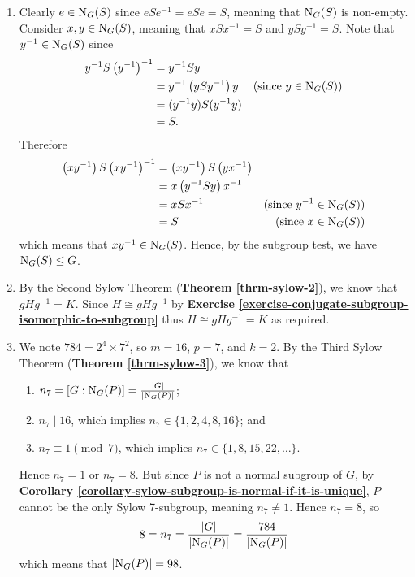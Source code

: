 \begin{enumerate}
    \item Clearly $e \in \mathrm{N}_{G}(S)$ since $eSe^{-1} = eSe = S$, meaning that $\mathrm{N}_{G}(S)$ is non-empty. Consider $x, y \in \mathrm{N}_{G}(S)$, meaning that $xSx^{-1} = S$ and $ySy^{-1} = S$. Note that $y^{-1} \in \mathrm{N}_{G}(S)$ since
    \begin{align*}
        y^{-1}S\left(y^{-1}\right)^{-1} &= y^{-1}Sy\\
        &= y^{-1}\left(ySy^{-1}\right)y & (\text{since } y \in \mathrm{N}_{G}(S))\\
        &= (y^{-1}y)S(y^{-1}y)\\
        &= S.
    \end{align*}
    Therefore
    \begin{align*}
        \left(xy^{-1}\right)S\left(xy^{-1}\right)^{-1} &= \left(xy^{-1}\right)S\left(yx^{-1}\right)\\
        &= x\left(y^{-1}Sy\right)x^{-1}\\
        &= xSx^{-1} & (\text{since } y^{-1} \in \mathrm{N}_{G}(S))\\
        &= S & (\text{since } x \in \mathrm{N}_{G}(S))
    \end{align*}
    which means that $xy^{-1} \in \mathrm{N}_{G}(S)$. Hence, by the subgroup test, we have $\mathrm{N}_{G}(S) \leq G$.

    \item By the Second Sylow Theorem (\textbf{Theorem \ref{thrm-sylow-2}}), we know that $gHg^{-1} = K$. Since $H \cong gHg^{-1}$ by \textbf{Exercise \ref{exercise-conjugate-subgroup-isomorphic-to-subgroup}} thus $H \cong gHg^{-1} = K$ as required.

    \item We note $784 = 2^4 \times 7^2$, so $m = 16$, $p = 7$, and $k = 2$. By the Third Sylow Theorem (\textbf{Theorem \ref{thrm-sylow-3}}), we know that
    \begin{enumerate}
        \item $n_7 = [G : \mathrm{N}_{G}(P)] = \frac{|G|}{|\mathrm{N}_{G}(P)|}$;
        \item $n_7 \mid 16$, which implies $n_7 \in \{1, 2, 4, 8, 16\}$; and
        \item $n_7 \equiv 1 \pmod 7$, which implies $n_7 \in \{1, 8, 15, 22, \dots\}$.
    \end{enumerate}
    Hence $n_7 = 1$ or $n_7 = 8$. But since $P$ is not a normal subgroup of $G$, by \textbf{Corollary \ref{corollary-sylow-subgroup-is-normal-if-it-is-unique}}, $P$ cannot be the only Sylow 7-subgroup, meaning $n_7 \neq 1$. Hence $n_7 = 8$, so
    \[
        8 = n_7 = \frac{|G|}{|\mathrm{N}_{G}(P)|} = \frac{784}{|\mathrm{N}_{G}(P)|}
    \]
    which means that $|\mathrm{N}_{G}(P)| = 98$.


\end{enumerate}
